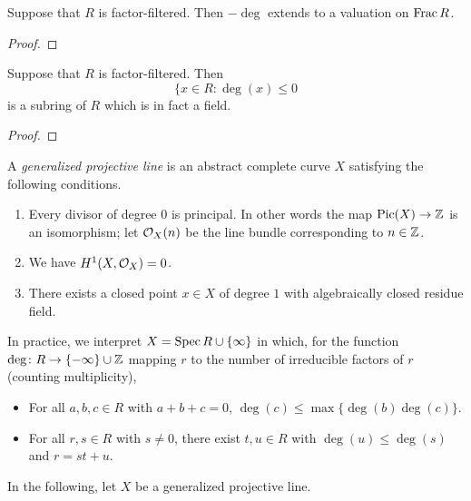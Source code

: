 \begin{lemma} \label{lem:factor filtered to valuation}
Suppose that $R$ is factor-filtered. Then $-\deg$ extends to a valuation on $\operatorname{Frac} R$.
\end{lemma}
\begin{proof}
\end{proof}

\begin{lemma}
Suppose that $R$ is factor-filtered. Then 
\[
\{x \in R\colon \deg(x) \leq 0
\]
is a subring of $R$ which is in fact a field.
\end{lemma}
\begin{proof}
\end{proof}

\begin{definition} \label{def:generalized projective line}
A \emph{generalized projective line} is an  abstract complete curve $X$ satisfying the following conditions.
\begin{enumerate}
\item[(a)] Every divisor of degree $0$ is principal. In other words the map $\operatorname{Pic}(X) \to \mathbb{Z}$
is an isomorphism; let $\mathcal{O}_X(n)$ be the line bundle corresponding to $n \in \mathbb{Z}$.
\item[(b)] We have $H^1(X, \mathcal{O}_X) = 0$. 
\item[(c)] There exists a closed point $x \in X$ of degree $1$ with algebraically closed residue field.
\end{enumerate}

In practice, we interpret $X = \operatorname{Spec} R \cup \{\infty\}$ in which,
 for the function $\deg\colon R \to \{-\infty\} \cup \mathbb{Z}$
 mapping $r$ to the number of irreducible factors of $r$ (counting multiplicity),
\begin{itemize}
\item For all $a,b,c \in R$ with $a+b+c = 0$, $\deg(c)\leq \max\{\deg(b) \deg(c)\}$.
\item For all $r,s \in R$ with $s \neq 0$, there exist $t,u \in R$ with $\deg(u) \leq \deg(s)$
and $r = st+u$.
\end{itemize}
\end{definition}

In the following, let $X$ be a generalized projective line.

